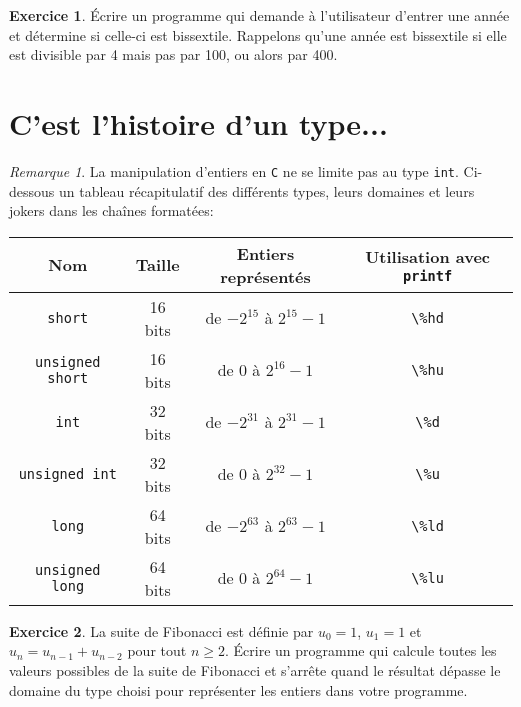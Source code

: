 \documentclass[french,a4paper]{article}
\theoremstyle{definition}
\newtheorem{exercise}{Exercice}
\theoremstyle{remark}
\newtheorem*{remark}{Remarque}
\newcommand{\inlinec}[1]{\lstinline[style=C]°#1°}
\begin{document}
\begin{exercise}
  \'Ecrire un programme qui demande à l'utilisateur d'entrer une année
  et détermine si celle-ci est bissextile. Rappelons qu'une année est
  bissextile si elle est divisible par 4 mais pas par 100, ou alors
  par 400.
\end{exercise}

\section{C'est l'histoire d'un type...}
\label{sec:type-integers}

\begin{remark}
  La manipulation d'entiers en {\tt C} ne se limite pas au type
  \inlinec{int}. Ci-dessous un tableau récapitulatif des différents
  types, leurs domaines et leurs jokers dans les chaînes formatées:
  \begin{center}
    \begin{tabular}{|c|c|c|c|}
      \hline Nom & Taille & Entiers représentés & Utilisation avec {\inlinec{printf}} \\
      \hline {\inlinec{short}} & 16 bits & de $-2^{15}$ à $2^{15}-1$ & {\inlinec{\%hd}} \\
      \hline {\inlinec{unsigned short}} & 16 bits & de $0$ à $2^{16}-1$ & {\inlinec{\%hu}} \\
      \hline {\inlinec{int}} & 32 bits & de $-2^{31}$ à $2^{31}-1$ & {\inlinec{\%d}} \\
      \hline {\inlinec{unsigned int}} & 32 bits & de $0$ à $2^{32}-1$ & {\inlinec{\%u}} \\
      \hline {\inlinec{long}} & 64 bits & de $-2^{63}$ à $2^{63}-1$ & {\inlinec{\%ld}} \\
      \hline {\inlinec{unsigned long}} & 64 bits & de $0$ à $2^{64}-1$ & {\inlinec{\%lu}} \\
      \hline
    \end{tabular}
  \end{center}
\end{remark}

\begin{exercise}
  La suite de Fibonacci est définie par $u_0=1$, $u_1=1$ et
  $u_n = u_{n-1} + u_{n-2}$ pour tout $n\geq 2$. \'Ecrire un programme
  qui calcule toutes les valeurs possibles de la suite de Fibonacci et
  s'arrête quand le résultat dépasse le domaine du type choisi pour
  représenter les entiers dans votre programme.
\end{exercise}
\end{document}
